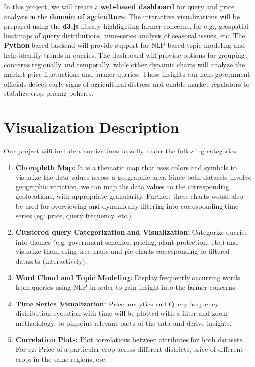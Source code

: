 \documentclass[11pt]{article}
\begin{document}
In this project, we will create a \textbf{web-based dashboard} for query and price analysis in the \textbf{domain of agriculture}. The interactive visualizations will be prepared using the \textbf{d3.js} library highlighting farmer concerns, for e.g., geospatial heatmaps of query distributions, time-series analysis of seasonal issues, etc. The \textbf{Python}-based backend will provide support for NLP-based topic modeling and help identify trends in queries. The dashboard will provide options for grouping concerns regionally and temporally, while other dynamic charts will analyze the market price fluctuations and farmer queries. These insights can help government officials detect early signs of agricultural distress and enable market regulators to stabilize crop pricing policies.

\section{Visualization Description}

Our project will include visualizations broadly under the following categories:
\begin{enumerate}
    \item \textbf{Choropleth Map:} It is a thematic map that uses colors and symbols to visualize the data values across a geographic area. Since both datasets involve geographic variation, we can map the data values to the corresponding geolocations, with appropriate granularity. Further, these charts would also be used for overviewing and dynamically filtering into corresponding time series (eg: price, query frequency, etc.).

    \item \textbf{Clustered query Categorization and Visualization:} Categorize queries into themes (e.g. government schemes, pricing, plant protection, etc.) and visualize them using tree maps and pie-charts corresponding to filtered datasets (interactively).
    
    \item \textbf{Word Cloud and Topic Modeling:} Display frequently occurring words from queries using NLP in order to gain insight into the farmer concerns.
    
    \item \textbf{Time Series Visualization:} Price analytics and Query frequency distribution evolution with time will be plotted with a filter-and-zoom methodology, to pinpoint relevant parts of the data and derive insights.
    
    \item \textbf{Correlation Plots:} Plot correlations between attributes for both datasets. For eg: Price of a particular crop across different districts, price of different crops in the same regions, etc.
\end{enumerate}
\end{document}
